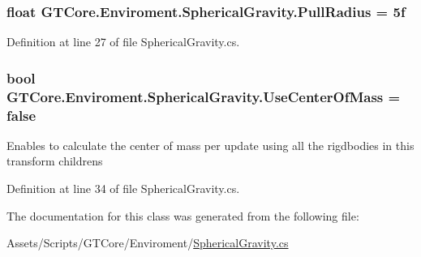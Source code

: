 \subsubsection[{Pull\+Radius}]{\setlength{\rightskip}{0pt plus 5cm}float G\+T\+Core.\+Enviroment.\+Spherical\+Gravity.\+Pull\+Radius = 5f}\label{class_g_t_core_1_1_enviroment_1_1_spherical_gravity_a503f1cdc6032d4bd7393fbed67af90b8}


Definition at line 27 of file Spherical\+Gravity.\+cs.

\hypertarget{class_g_t_core_1_1_enviroment_1_1_spherical_gravity_ae3cb893e14719fe01d597926da52ab9e}{}
\subsubsection[{Use\+Center\+Of\+Mass}]{\setlength{\rightskip}{0pt plus 5cm}bool G\+T\+Core.\+Enviroment.\+Spherical\+Gravity.\+Use\+Center\+Of\+Mass = false}\label{class_g_t_core_1_1_enviroment_1_1_spherical_gravity_ae3cb893e14719fe01d597926da52ab9e}


Enables to calculate the center of mass per update using all the rigdbodies in this transform childrens 



Definition at line 34 of file Spherical\+Gravity.\+cs.



The documentation for this class was generated from the following file\+:\begin{DoxyCompactItemize}
\item 
Assets/\+Scripts/\+G\+T\+Core/\+Enviroment/\hyperlink{_spherical_gravity_8cs}{Spherical\+Gravity.\+cs}\end{DoxyCompactItemize}
